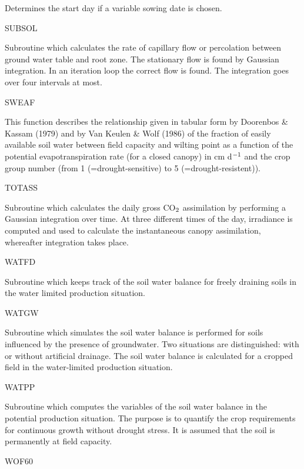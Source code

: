 \begin{indenting}{5.08cm}
Determines the start day if a variable sowing date is chosen.
\end{indenting}
SUBSOL
\testlastline

\begin{indenting}{5.08cm}
Subroutine which calculates the rate of capillary flow or
perco\-lation between ground water table and root zone. The
stationary flow is found by Gaussian integrati\-on. In an
iteration loop the correct flow is found. The integrati\-on goes
over four intervals at most.
\end{indenting}
SWEAF
\testlastline

\begin{indenting}{5.08cm}
This function describes the relati\-onship given in tabular form
by Dooren\-bos \& Kas\-sam (1979) and by Van Keulen \& Wolf
(1986) of the fraction of easily available soil water between
field capacity and wilting point as a function of the potential
evapotranspirati\-on rate (for a closed canopy) in cm d$^{{\rm -1}}$ and
the crop group number (from 1 (=drought-sensitive) to 5
(=drought-resistent)).
\end{indenting}
TOTASS
\testlastline

\begin{indenting}{5.08cm}
Subroutine which calculates the daily gross CO$_{{\rm 2}}$ assimilati\-on
by per\-forming a Gaussian integration over time. At three
different times of the day, irradiance is computed and used
to calculate the instantaneous canopy assimilati\-on, whereafter
integration takes place. 
\end{indenting}
WATFD
\testlastline

\begin{indenting}{5.08cm}
Subroutine which keeps track of the soil water balance for
freely draining soils in the water limited production situa\-tion.
\end{indenting}
WATGW
\testlastline

\begin{indenting}{5.08cm}
Subroutine which simulates the soil water balance is per\-formed for soils influenced by the presence of groun\-dwater.
Two situati\-ons are distin\-guished: with or without artificial
drainage. The soil water balance is calculated for a cropped
field in the water-limited production situation.
\end{indenting}
WATPP
\testlastline

\begin{indenting}{5.08cm}
Subroutine which computes the variables of the soil water
balan\-ce in the potential production situation. The purpose is
to quantify the crop requirements for continuous growth
without drought stress. It is assu\-med that the soil is per\-manently at field capacity.
\end{indenting}
WOF60
\testlastline

